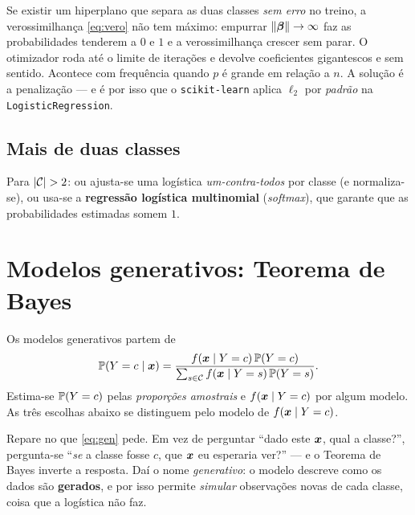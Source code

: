 \documentclass[11pt,a4paper]{article}
\begin{document}
\begin{atencao}
Se existir um hiperplano que separa as duas classes \emph{sem erro} no treino, a
verossimilhança \eqref{eq:vero} não tem máximo: empurrar $\left\lVert \bm{\beta} \right\rVert\to\infty$
faz as probabilidades tenderem a $0$ e $1$ e a verossimilhança crescer sem parar. O
otimizador roda até o limite de iterações e devolve coeficientes gigantescos e sem
sentido. Acontece com frequência quando $p$ é grande em relação a $n$. A solução é
a penalização --- e é por isso que o \texttt{scikit-learn} aplica $\ell_2$ por
\emph{padrão} na \texttt{LogisticRegression}.
\end{atencao}

\subsection{Mais de duas classes}
Para $\left\lvert \mathcal{C} \right\rvert>2$: ou ajusta-se uma logística \emph{um-contra-todos} por
classe (e normaliza-se), ou usa-se a \textbf{regressão logística multinomial}
(\emph{softmax}), que garante que as probabilidades estimadas somem $1$.

\section{Modelos generativos: Teorema de Bayes}
Os modelos generativos partem de
\begin{equation}\label{eq:gen}
  \mathbb{P}(Y=c\mid\bm{x}) = \frac{f(\bm{x}\mid Y=c)\,\mathbb{P}(Y=c)}
                          {\sum_{s\in\mathcal{C}} f(\bm{x}\mid Y=s)\,\mathbb{P}(Y=s)}.
\end{equation}
Estima-se $\mathbb{P}(Y=c)$ pelas \emph{proporções amostrais} e $f(\bm{x}\mid Y=c)$ por
algum modelo. As três escolhas abaixo se distinguem pelo modelo de
$f(\bm{x}\mid Y=c)$.

\begin{ideia}
Repare no que \eqref{eq:gen} pede. Em vez de perguntar ``dado este $\bm{x}$, qual a
classe?'', pergunta-se ``\emph{se} a classe fosse $c$, que $\bm{x}$ eu esperaria ver?''
--- e o Teorema de Bayes inverte a resposta. Daí o nome \emph{generativo}: o modelo
descreve como os dados são \textbf{gerados}, e por isso permite \emph{simular}
observações novas de cada classe, coisa que a logística não faz.
\end{ideia}
\end{document}
